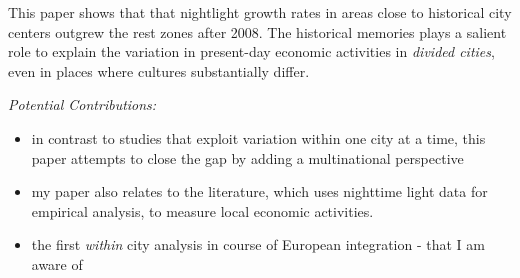 This paper shows that   that nightlight growth rates in areas close to historical
city centers outgrew the rest zones after 2008. The historical memories plays a salient role to explain the variation in present-day economic activities in \textit{divided cities}, even in places where cultures substantially differ.  
\vspace{0.3cm}
\par \textit{Potential Contributions: }
\begin{itemize}
    \item in contrast to studies that exploit variation within one city at a time, this paper
attempts to close the gap by adding a multinational perspective
\item my paper also relates to the literature, which uses nighttime light data for empirical
analysis, to measure local economic activities.
\item the first \textit{within} city analysis in course of European
integration - that I am aware of


    \end{itemize}
    